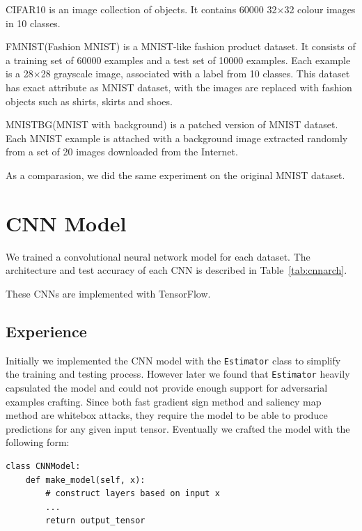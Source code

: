 \documentclass{article}
\begin{document}
CIFAR10\cite{cifar10} is an image collection of objects. It contains 60000 32$\times$32 colour images in 10 classes.

FMNIST(Fashion MNIST)\cite{fmnist} is a MNIST-like fashion product dataset. It consists of a training set of 60000 examples and a test set of 10000 examples. Each example is a 28$\times$28 grayscale image, associated with a label from 10 classes. This dataset has exact attribute as MNIST dataset\cite{mnist}, with the images are replaced with fashion objects such as shirts, skirts and shoes.

MNISTBG(MNIST with background)\cite{mnistbg} is a patched version of MNIST dataset. Each MNIST example is attached with a background image extracted randomly from a set of 20 images downloaded from the Internet.

As a comparasion, we did the same experiment on the original MNIST dataset.

\section{CNN Model}

We trained a convolutional neural network model for each dataset.
The architecture and test accuracy of each CNN is described in Table~\ref{tab:cnnarch}.

These CNNs are implemented with TensorFlow\cite{tensorflow}.

\subsection{Experience}

Initially we implemented the CNN model with the \lstinline{Estimator} class to simplify the training and testing process.
However later we found that \lstinline{Estimator} heavily capsulated the model and could not provide enough support for adversarial examples crafting.
Since both fast gradient sign method and saliency map method are whitebox attacks, they require the model to be able to produce
predictions for any given input tensor. Eventually we crafted the model with the following form:

\begin{lstlisting}
class CNNModel:
    def make_model(self, x):
        # construct layers based on input x
        ...
        return output_tensor
\end{lstlisting}
\end{document}

